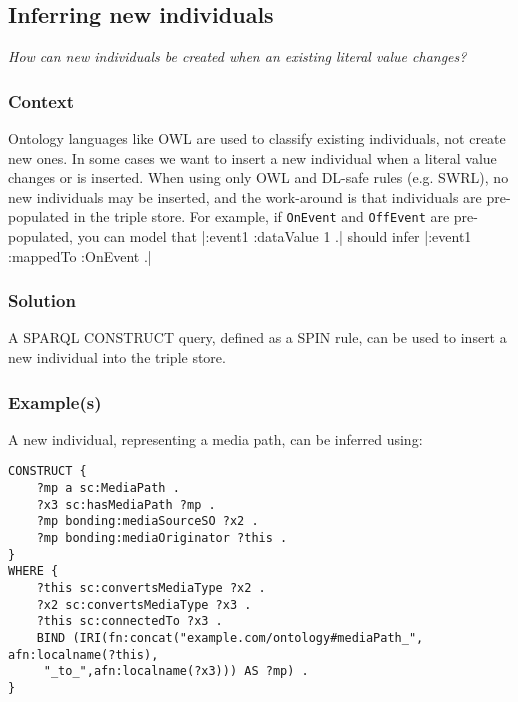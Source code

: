 \subsection{Inferring new individuals}

\emph{How can new individuals be created when an existing literal value changes?}

\subsubsection{Context}

Ontology languages like \ac{OWL} are used to classify existing individuals, not create new ones. In some cases we want to insert a new individual when a literal value changes or is inserted. When using only \ac{OWL} and DL-safe rules (e.g. \ac{SWRL}), no new individuals may be inserted, and the work-around is that individuals are pre-populated in the triple store. For example, if \texttt{OnEvent} and \texttt{OffEvent} are pre-populated, you can model that |:event1 :dataValue 1 .| should infer |:event1 :mappedTo :OnEvent .|

\subsubsection{Solution}

A \ac{SPARQL} CONSTRUCT query, defined as a \ac{SPIN} rule, can be used to insert a new individual into the triple store.
 
\subsubsection{Example(s)}

A new individual, representing a media path, can be inferred using:

\begin{verbatim} 
CONSTRUCT {
    ?mp a sc:MediaPath .
    ?x3 sc:hasMediaPath ?mp .
    ?mp bonding:mediaSourceSO ?x2 .
    ?mp bonding:mediaOriginator ?this .
}
WHERE {
    ?this sc:convertsMediaType ?x2 .
    ?x2 sc:convertsMediaType ?x3 .
    ?this sc:connectedTo ?x3 .
    BIND (IRI(fn:concat("example.com/ontology#mediaPath_", afn:localname(?this),
     "_to_",afn:localname(?x3))) AS ?mp) .
}
\end{verbatim}

